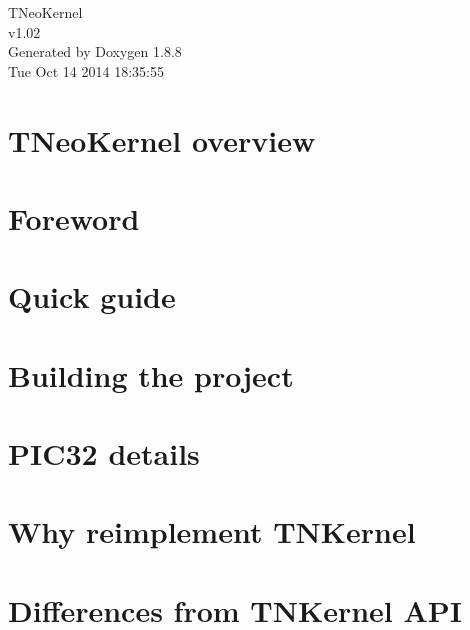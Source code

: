 \documentclass[twoside]{book}
\newcommand{\+}{\discretionary{\mbox{\scriptsize$\hookleftarrow$}}{}{}}
\newcommand{\clearemptydoublepage}{%
  \newpage{\pagestyle{empty}\cleardoublepage}%
}
\begin{document}
\hypersetup{pageanchor=false,
             bookmarks=true,
             bookmarksnumbered=true,
             pdfencoding=unicode
            }
\begin{titlepage}
\vspace*{7cm}
\begin{center}%
{\Large T\+Neo\+Kernel \\[1ex]\large v1.\+02 }\\
\vspace*{1cm}
{\large Generated by Doxygen 1.8.8}\\
\vspace*{0.5cm}
{\small Tue Oct 14 2014 18:35:55}\\
\end{center}
\end{titlepage}
\clearemptydoublepage
\tableofcontents
\clearemptydoublepage
{}
\hypersetup{pageanchor=true}

\chapter{T\+Neo\+Kernel overview}
\label{index}\hypertarget{index}{}
\chapter{Foreword}
\label{foreword}
\hypertarget{foreword}{}

\chapter{Quick guide}
\label{quick_guide}
\hypertarget{quick_guide}{}

\chapter{Building the project}
\label{building}
\hypertarget{building}{}

\chapter{P\+I\+C32 details}
\label{pic32_details}
\hypertarget{pic32_details}{}

\chapter{Why reimplement T\+N\+Kernel}
\label{why_reimplement}
\hypertarget{why_reimplement}{}

\chapter{Differences from T\+N\+Kernel A\+P\+I}
\label{tnkernel_diff}
\hypertarget{tnkernel_diff}{}

\end{document}
